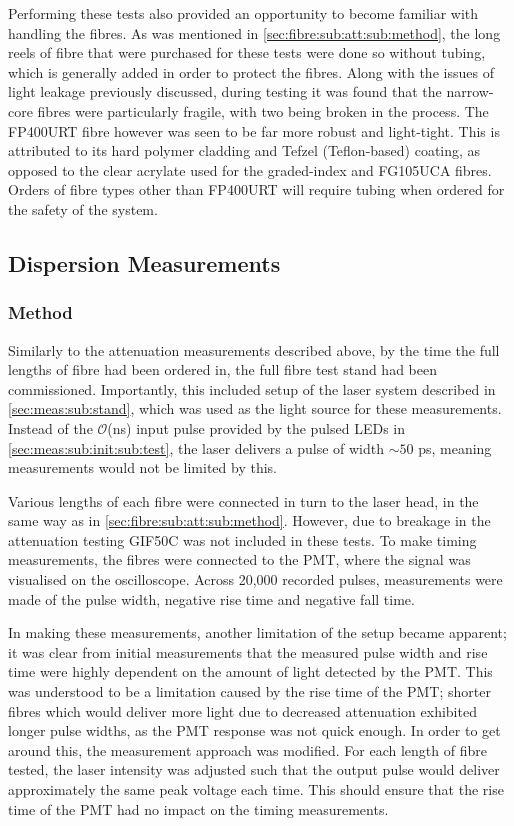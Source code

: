 \documentclass[a4paper,11pt]{article}
\let\oldsim\sim
\renewcommand{\sim}{{\oldsim}}
\begin{document}
Performing these tests also provided an opportunity to become familiar with handling the fibres. As was mentioned in \cref{sec:fibre:sub:att:sub:method}, the long reels of fibre that were purchased for these tests were done so without tubing, which is generally added in order to protect the fibres. Along with the issues of light leakage previously discussed, during testing it was found that the narrow-core fibres were particularly fragile, with two being broken in the process. The FP400URT fibre however was seen to be far more robust and light-tight. This is attributed to its hard polymer cladding and Tefzel (Teflon-based) coating, as opposed to the clear acrylate used for the graded-index and FG105UCA fibres. Orders of fibre types other than FP400URT will require tubing when ordered for the safety of the system.

\subsection{Dispersion Measurements}

\subsubsection{Method}

Similarly to the attenuation measurements described above, by the time the full lengths of fibre had been ordered in, the full fibre test stand had been commissioned. Importantly, this included setup of the laser system described in \cref{sec:meas:sub:stand}, which was used as the light source for these measurements. Instead of the $\mathcal{O}$(ns) input pulse provided by the pulsed LEDs in \cref{sec:meas:sub:init:sub:test}, the laser delivers a pulse of width $\sim50$ ps, meaning measurements would not be limited by this.

Various lengths of each fibre were connected in turn to the laser head, in the same way as in \cref{sec:fibre:sub:att:sub:method}. However, due to breakage in the attenuation testing GIF50C was not included in these tests. To make timing measurements, the fibres were connected to the PMT, where the signal was visualised on the oscilloscope. Across 20,000 recorded pulses, measurements were made of the pulse width, negative rise time and negative fall time.

In making these measurements, another limitation of the setup became apparent; it was clear from initial measurements that the measured pulse width and rise time were highly dependent on the amount of light detected by the PMT. This was understood to be a limitation caused by the rise time of the PMT; shorter fibres which would deliver more light due to decreased attenuation exhibited longer pulse widths, as the PMT response was not quick enough. In order to get around this, the measurement approach was modified. For each length of fibre tested, the laser intensity was adjusted such that the output pulse would deliver approximately the same peak voltage each time. This should ensure that the rise time of the PMT had no impact on the timing measurements.
\end{document}
